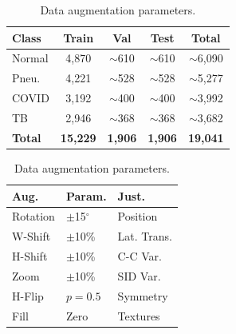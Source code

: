 {\renewcommand{\arraystretch}{1.2}
\begin{table}[htbp]
    \centering
    \begin{minipage}[c]{0.52\textwidth}
        \centering
        \caption{Complete dataset split.}
        \label{tab:chest_dataset_splits}
        \small
        \begin{tabularx}{\textwidth}{|l|c|c|c|c|}
            \hline
            \textbf{Class} & \textbf{Train} & \textbf{Val} & \textbf{Test} & \textbf{Total} \\
            \hline
            Normal & 4,870 & $\sim$610 & $\sim$610 & $\sim$6,090 \\
            \hline
            Pneu. & 4,221 & $\sim$528 & $\sim$528 & $\sim$5,277 \\
            \hline
            COVID & 3,192 & $\sim$400 & $\sim$400 & $\sim$3,992 \\
            \hline
            TB & 2,946 & $\sim$368 & $\sim$368 & $\sim$3,682 \\
            \hline
            \textbf{Total} & \textbf{15,229} & \textbf{1,906} & \textbf{1,906} & \textbf{19,041} \\
            \hline
        \end{tabularx}
    \end{minipage}
    \hfill
    \begin{minipage}[c]{0.44\textwidth}
        \centering
        \caption{Data augmentation parameters.}
        \label{tab:chest_augmentation}
        \small
        \begin{tabularx}{\textwidth}{|l|l|X|}
            \hline
            \textbf{Aug.} & \textbf{Param.} & \textbf{Just.} \\
            \hline
            Rotation & $\pm$15$^\circ$ & Position \\
            \hline
            W-Shift & $\pm$10\% & Lat. Trans. \\
            \hline
            H-Shift & $\pm$10\% & C-C Var. \\
            \hline
            Zoom & $\pm$10\% & SID Var. \\
            \hline
            H-Flip & $p=0.5$ & Symmetry \\
            \hline
            Fill & Zero & Textures \\
            \hline
        \end{tabularx}
    \end{minipage}
\end{table}
}


